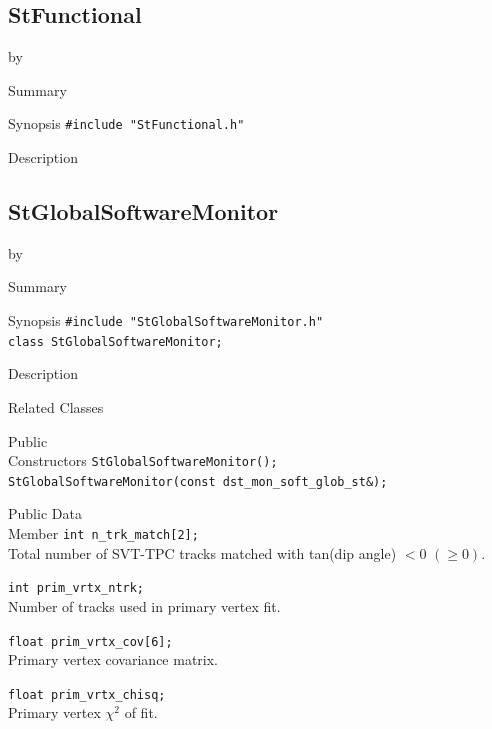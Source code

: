 \documentclass[twoside]{article}
\newcommand{\entrylabel}[1]{\mbox{\textbf{{#1}}}\hfil}%
\newenvironment{entry}
{\begin{list}{}%
    {\renewcommand{\makelabel}{\entrylabel}%
     \setlength{\labelwidth}{90pt}%
     \setlength{\leftmargin}{\labelwidth}
     \advance\leftmargin by \labelsep%
      }%
    }%
  {\end{list}}
\newcommand{\Entrylabel}[1]%
{\raisebox{0pt}[1ex][0pt]{\makebox[\labelwidth][l]%
    {\parbox[t]{\labelwidth}{\hspace{0pt}\textbf{{#1}}}}}}
\newenvironment{Entry}%
{\renewcommand{\entrylabel}{\Entrylabel}\begin{entry}}%
  {\end{entry}}
\begin{document}
\subsection{StFunctional}
\label{sec:StFunctional}
\begin{Entry}
\item[Summary]
\item[Synopsis]
    \verb+#include "StFunctional.h"+\\
\item[Description]
\end{Entry}
\clearpage


\subsection{StGlobalSoftwareMonitor}
\label{sec:StGlobalSoftwareMonitor}
\begin{Entry}
\item[Summary]
\item[Synopsis]
    \verb+#include "StGlobalSoftwareMonitor.h"+\\
    \verb+class StGlobalSoftwareMonitor;+\\
\item[Description]
\item[Related Classes]
\item[Public\\ Constructors]
    \verb+StGlobalSoftwareMonitor();+\\
    \verb+StGlobalSoftwareMonitor(const dst_mon_soft_glob_st&);+\\
\item[Public Data\\ Member]
    \verb+int n_trk_match[2];+\\
    Total number of SVT-TPC tracks matched with tan(dip angle) $< 0$
    $(\ge 0)$.

    \verb+int prim_vrtx_ntrk;+\\
    Number of tracks used in primary vertex fit.

    \verb+float prim_vrtx_cov[6];+\\
    Primary vertex covariance matrix.

    \verb+float prim_vrtx_chisq;+\\
    Primary vertex $\chi^2$ of fit.
\end{Entry}
\clearpage
\end{document}
